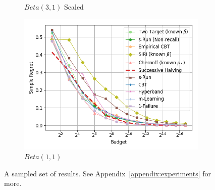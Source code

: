 \begin{figure}
\begin{subfigure}{0.325\textwidth}
	\caption{$Beta(3,1)$ Scaled}
	\label{fig:sh-anytime:alpha1_beta3_scaled}
\end{subfigure}
\begin{subfigure}{0.325\textwidth}%
	\includegraphics[width=\textwidth]{fixedbudget/figures/folder2/alpha1_beta1_unscaled.png}
	\caption{$Beta(1,1)$ }
	\label{fig:sh-unscaled-alpha1_beta1_unscaled}
\end{subfigure}
\caption{A sampled set of results. See Appendix~\ref{appendix:experiments} for more.}
\end{figure}

